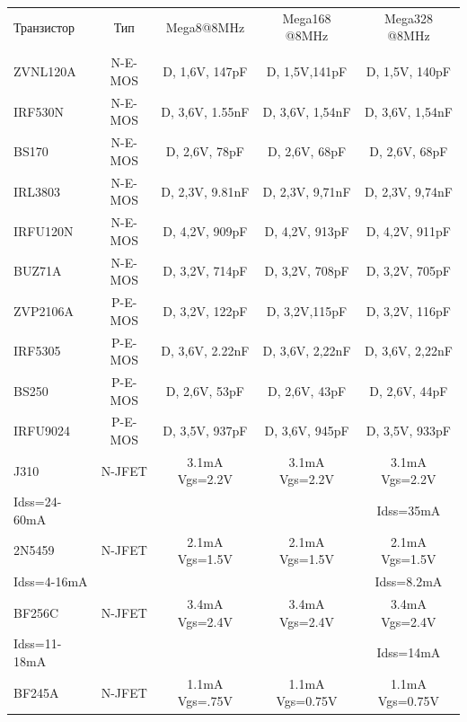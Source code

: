 \begin{table}[H]
  \begin{center}
    \begin{tabular}{| l | c | c | c | c |}
    \hline
 Транзистор  &  Тип    & Mega8@8MHz       & Mega168 @8MHz    & Mega328 @8MHz \\
             &         &                  &                  &               \\
    \hline
    \hline
ZVNL120A     & N-E-MOS & D, 1,6V, 147pF   & D, 1,5V,141pF    & D, 1,5V, 140pF \\
    \hline
IRF530N      & N-E-MOS & D, 3,6V, 1.55nF  & D, 3,6V, 1,54nF  & D, 3,6V, 1,54nF \\
    \hline
BS170        & N-E-MOS & D, 2,6V, 78pF    & D, 2,6V, 68pF    & D, 2,6V, 68pF \\
    \hline
IRL3803      & N-E-MOS & D, 2,3V, 9.81nF  & D, 2,3V, 9,71nF  & D, 2,3V, 9,74nF \\
    \hline
IRFU120N     & N-E-MOS & D, 4,2V, 909pF   & D, 4,2V, 913pF   & D, 4,2V, 911pF \\
    \hline
BUZ71A       & N-E-MOS & D, 3,2V, 714pF   & D, 3,2V, 708pF   & D, 3,2V, 705pF \\
    \hline
ZVP2106A     & P-E-MOS & D, 3,2V, 122pF   & D, 3,2V,115pF    & D, 3,2V, 116pF \\
    \hline
IRF5305      & P-E-MOS & D, 3,6V, 2.22nF  & D, 3,6V, 2,22nF  & D, 3,6V, 2,22nF \\
    \hline
BS250        & P-E-MOS & D, 2,6V, 53pF    & D, 2,6V, 43pF    & D, 2,6V, 44pF \\
    \hline
IRFU9024     & P-E-MOS & D, 3,5V, 937pF   & D, 3,6V, 945pF   & D, 3,5V, 933pF \\
    \hline
J310         & N-JFET  & 3.1mA Vgs=2.2V   & 3.1mA Vgs=2.2V   & 3.1mA Vgs=2.2V \\
Idss=24-60mA &         &                  &                  & Idss=35mA      \\
    \hline
2N5459       & N-JFET  & 2.1mA Vgs=1.5V   & 2.1mA Vgs=1.5V   & 2.1mA Vgs=1.5V \\
Idss=4-16mA &          &                  &                  & Idss=8.2mA     \\
    \hline
BF256C       & N-JFET  & 3.4mA Vgs=2.4V   & 3.4mA Vgs=2.4V   & 3.4mA Vgs=2.4V \\
Idss=11-18mA &         &                  &                  & Idss=14mA      \\
    \hline
BF245A       & N-JFET  & 1.1mA Vgs=.75V   & 1.1mA Vgs=0.75V  & 1.1mA Vgs=0.75V \\

\end{tabular}
\end{center}
\end{table}
